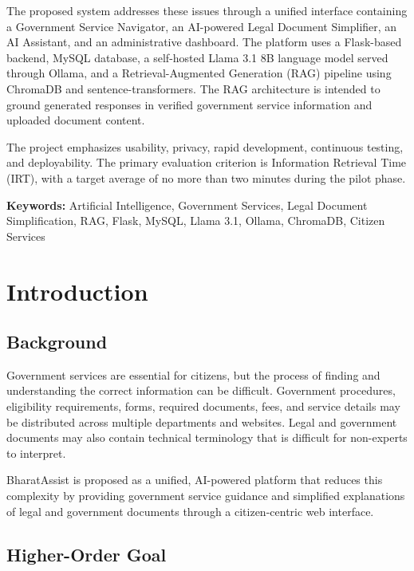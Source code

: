 \documentclass[12pt,a4paper]{report}
\begin{document}
The proposed system addresses these issues through a unified interface containing a Government Service Navigator, an AI-powered Legal Document Simplifier, an AI Assistant, and an administrative dashboard. The platform uses a Flask-based backend, MySQL database, a self-hosted Llama 3.1 8B language model served through Ollama, and a Retrieval-Augmented Generation (RAG) pipeline using ChromaDB and sentence-transformers. The RAG architecture is intended to ground generated responses in verified government service information and uploaded document content.

The project emphasizes usability, privacy, rapid development, continuous testing, and deployability. The primary evaluation criterion is Information Retrieval Time (IRT), with a target average of no more than two minutes during the pilot phase.

\textbf{Keywords:} Artificial Intelligence, Government Services, Legal Document Simplification, RAG, Flask, MySQL, Llama 3.1, Ollama, ChromaDB, Citizen Services

\tableofcontents
\listoftables
\newpage

\chapter{Introduction}

\section{Background}

Government services are essential for citizens, but the process of finding and understanding the correct information can be difficult. Government procedures, eligibility requirements, forms, required documents, fees, and service details may be distributed across multiple departments and websites. Legal and government documents may also contain technical terminology that is difficult for non-experts to interpret.

BharatAssist is proposed as a unified, AI-powered platform that reduces this complexity by providing government service guidance and simplified explanations of legal and government documents through a citizen-centric web interface.

\section{Higher-Order Goal}
\end{document}
